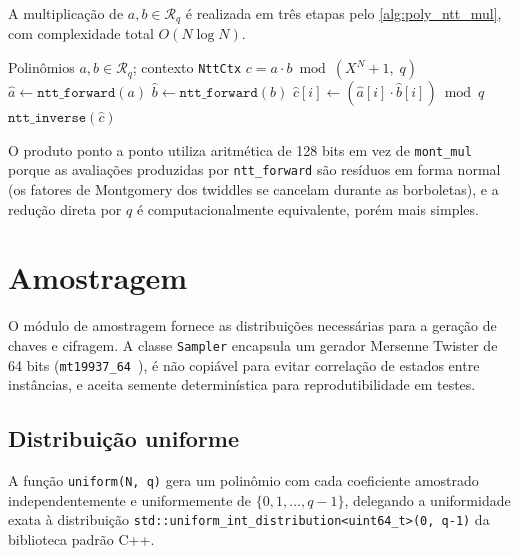 \documentclass[11pt,a4paper]{report}
\newcommand{\Rq}{\mathcal{R}_q}
\begin{document}
A multiplicação de $a, b \in \Rq$ é realizada em três etapas pelo \cref{alg:poly_ntt_mul},
com complexidade total $O(N \log N)$.

\begin{algorithm}[ht]
\caption{\texttt{poly\_ntt\_mul}: multiplicação polinomial negacíclica via NTT}
\label{alg:poly_ntt_mul}
\begin{algorithmic}[1]
\Require Polinômios $a, b \in \Rq$;\; contexto \texttt{NttCtx}
\Ensure $c = a \cdot b \bmod (X^N+1,\; q)$
\State $\hat{a} \gets \texttt{ntt\_forward}(a)$
\State $\hat{b} \gets \texttt{ntt\_forward}(b)$
  \State $\hat{c}[i] \gets (\hat{a}[i] \cdot \hat{b}[i]) \bmod q$
\EndFor
\State \Return $\texttt{ntt\_inverse}(\hat{c})$
\end{algorithmic}
\end{algorithm}

O produto ponto a ponto utiliza aritmética de 128 bits em vez de \texttt{mont\_mul}
porque as avaliações produzidas por \texttt{ntt\_forward} são resíduos em forma normal
(os fatores de Montgomery dos twiddles se cancelam durante as borboletas), e a redução
direta por $q$ é computacionalmente equivalente, porém mais simples.

\chapter{Amostragem}
\label{cap:sampling}

O módulo de amostragem fornece as distribuições necessárias para a geração de chaves e
cifragem. A classe \texttt{Sampler} encapsula um gerador Mersenne Twister de 64 bits
(\texttt{mt19937\_64}~\cite{Matsumoto1998}), é não copiável para evitar correlação de
estados entre instâncias, e aceita semente determinística para reprodutibilidade em testes.

\section{Distribuição uniforme}
\label{sec:uniform}

A função \texttt{uniform(N, q)} gera um polinômio com cada coeficiente amostrado
independentemente e uniformemente de $\{0, 1, \ldots, q-1\}$, delegando a uniformidade
exata à distribuição \texttt{std::uniform\_int\_distribution<uint64\_t>(0, q-1)} da
biblioteca padrão C++.
\end{document}

